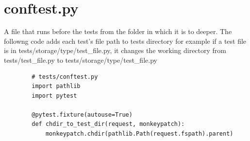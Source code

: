     
\section{conftest.py}
    A file that runs before the tests from the folder in which it is to deeper.
    The followng code adds each test's file path to tests directory for example if a test file is in tests/storage/type/test\_file.py, it changes the working directory from tests/test\_file.py to tests/storage/type/test\_file.py
    \begin{verbatim}
        # tests/conftest.py
        import pathlib
        import pytest
        
        @pytest.fixture(autouse=True)
        def chdir_to_test_dir(request, monkeypatch):
            monkeypatch.chdir(pathlib.Path(request.fspath).parent)
    \end{verbatim}